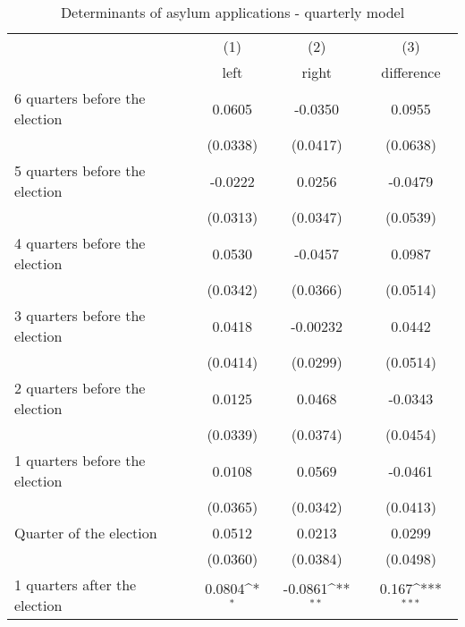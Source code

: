 \begin{table}[!ht]\centering \footnotesize
\def\sym#1{\ifmmode^{#1}\else\(^{#1}\)\fi}
\caption{Determinants of asylum applications - quarterly model}
\begin{tabular}{l*{3}{c}}
\hline\hline
                    &\multicolumn{1}{c}{(1)}&\multicolumn{1}{c}{(2)}&\multicolumn{1}{c}{(3)}\\
                    &\multicolumn{1}{c}{left}&\multicolumn{1}{c}{right}&\multicolumn{1}{c}{difference}\\
\hline
 6 quarters before the election&      0.0605         &     -0.0350         &      0.0955         \\
                    &    (0.0338)         &    (0.0417)         &    (0.0638)         \\
[0,5em]
 5 quarters before the election&     -0.0222         &      0.0256         &     -0.0479         \\
                    &    (0.0313)         &    (0.0347)         &    (0.0539)         \\
[0,5em]
 4 quarters before the election&      0.0530         &     -0.0457         &      0.0987         \\
                    &    (0.0342)         &    (0.0366)         &    (0.0514)         \\
[0,5em]
 3 quarters before the election&      0.0418         &    -0.00232         &      0.0442         \\
                    &    (0.0414)         &    (0.0299)         &    (0.0514)         \\
[0,5em]
 2 quarters before the election&      0.0125         &      0.0468         &     -0.0343         \\
                    &    (0.0339)         &    (0.0374)         &    (0.0454)         \\
[0,5em]
 1 quarters before the election&      0.0108         &      0.0569         &     -0.0461         \\
                    &    (0.0365)         &    (0.0342)         &    (0.0413)         \\
[0,5em]
Quarter of the election&      0.0512         &      0.0213         &      0.0299         \\
                    &    (0.0360)         &    (0.0384)         &    (0.0498)         \\
[0,5em]
 1 quarters after the election&      0.0804\sym{*}  &     -0.0861\sym{**} &       0.167\sym{***}\\

\end{tabular}
\end{table}
